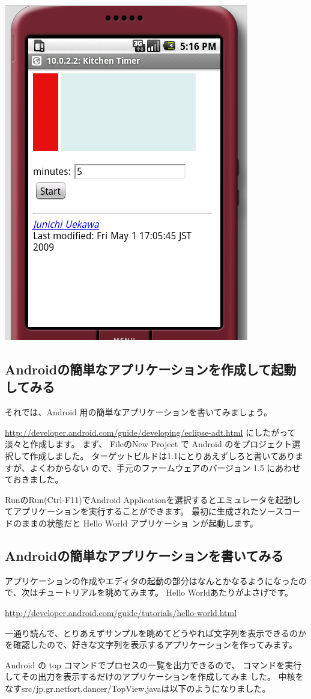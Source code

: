 \documentclass[mingoth,a4paper]{jsarticle}
\begin{document}
\begin{commandline}
\includegraphics[width=0.3\hsize]{image200905/android-timer.png}

\subsection{Androidの簡単なアプリケーションを作成して起動してみる}

それでは、Android 用の簡単なアプリケーションを書いてみましょう。

\url{http://developer.android.com/guide/developing/eclipse-adt.html}
にしたがって淡々と作成します。
まず、
FileのNew Project で Android のをプロジェクト選択して作成しました。
ターゲットビルドは1.1にとりあえずしろと書いてありますが、よくわからない
ので、手元のファームウェアのバージョン 1.5 にあわせておきました。

RunのRun(Ctrl-F11)でAndroid Applicationを選択するとエミュレータを起動し
てアプリケーションを実行することができます。
最初に生成されたソースコードのままの状態だと Hello World アプリケーショ
ンが起動します。

\subsection{Androidの簡単なアプリケーションを書いてみる}

アプリケーションの作成やエディタの起動の部分はなんとかなるようになったの
で、次はチュートリアルを眺めてみます。
Hello Worldあたりがよさげです。

\url{http://developer.android.com/guide/tutorials/hello-world.html}

一通り読んで、とりあえずサンプルを眺めてどうやれば文字列を表示できるのか
を確認したので、好きな文字列を表示するアプリケーションを作ってみます。

Android の top コマンドでプロセスの一覧を出力できるので、
コマンドを実行してその出力を表示するだけのアプリケーションを作成してみま
した。
中核をなすsrc/jp.gr.netfort.dancer/TopView.javaは以下のようになりました。


\end{commandline}
\end{document}
